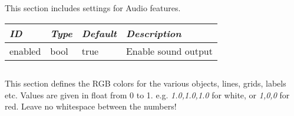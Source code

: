 This section includes settings for Audio features.

\noindent%
\begin{longtable}{l|l|l|p{65mm}}
\toprule
\emph{ID}         & \emph{Type} & \emph{Default} & \emph{Description}\\\midrule
enabled           & bool        & true           & Enable sound output\\\bottomrule
\end{longtable}

\subsection{}

This section defines the RGB colors for the various objects, lines,
grids, labels etc. Values are given in float from 0 to
1. e.g. \emph{1.0,1.0,1.0} for white, or \emph{1,0,0} for red. Leave
no whitespace between the numbers!


